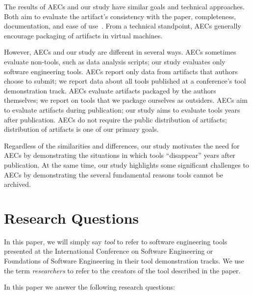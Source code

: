 \documentclass[10pt,conference]{IEEEtran}
\begin{document}
The results of AECs and our study have 
similar goals and technical approaches.
Both aim to evaluate the artifact's 
consistency with the paper,
completeness,
documentation,
and ease of use~\cite{evaluate}.
From a technical standpoint, AECs generally  
encourage packaging of artifacts in virtual machines.

However, AECs and our study are different in several
ways.
AECs sometimes evaluate non-tools, such as data analysis scripts; 
our study evaluates only software engineering tools.
AECs report only data from artifacts that authors choose to submit;
we report data about all tools published at a 
conference's tool demonstration track.
AECs evaluate artifacts packaged by the authors themselves;
we report on tools that we package ourselves as outsiders.
AECs aim to evaluate artifacts during publication;
our study aims to evaluate tools years after publication.
AECs do not require the public distribution of artifacts;
distribution of artifacts is one of our primary goals.

Regardless of the similarities and differences,
our study motivates the need for AECs by demonstrating
the situations in which tools ``disappear'' years
after publication.
At the same time, our study highlights some significant
challenges to AECs by demonstrating the several
fundamental reasons tools cannot be archived. 


\section{Research Questions}

In this paper, we will simply say \emph{tool}
to refer to software engineering tools presented at
the International Conference on Software Engineering
or Foundations of Software Engineering in their
tool demonstration tracks.
We use the term \emph{researchers} to refer to 
the creators of the tool described in the paper. 

In this paper we answer the following research questions:
\end{document}
